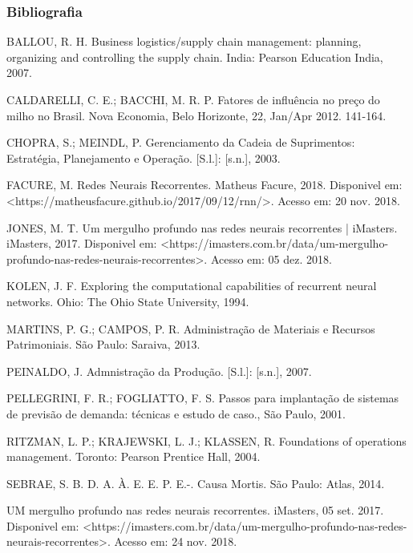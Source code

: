 \documentclass[9pt]{beamer}
\begin{document}
	\begin{frame}[allowframebreaks]
		\frametitle{Bibliografia}
	
		BALLOU, R. H. Business logistics/supply chain management: planning, organizing and controlling the supply chain. India: Pearson Education India, 2007.
		
		CALDARELLI, C. E.; BACCHI, M. R. P. Fatores de influência no preço do milho no Brasil. Nova Economia, Belo Horizonte, 22, Jan/Apr 2012. 141-164.
		
		CHOPRA, S.; MEINDL, P. Gerenciamento da Cadeia de Suprimentos: Estratégia, Planejamento e Operação. [S.l.]: [s.n.], 2003.
		
		FACURE, M. Redes Neurais Recorrentes. Matheus Facure, 2018. Disponivel em: <https://matheusfacure.github.io/2017/09/12/rnn/>. Acesso em: 20 nov. 2018.
		
		JONES, M. T. Um mergulho profundo nas redes neurais recorrentes | iMasters. iMasters, 2017. Disponivel em: <https://imasters.com.br/data/um-mergulho-profundo-nas-redes-neurais-recorrentes>. Acesso em: 05 dez. 2018.
		
		KOLEN, J. F. Exploring the computational capabilities of recurrent neural networks. Ohio: The Ohio State University, 1994.
		
		MARTINS, P. G.; CAMPOS, P. R. Administração de Materiais e Recursos Patrimoniais. São Paulo: Saraiva, 2013.
		
		PEINALDO, J. Admnistração da Produção. [S.l.]: [s.n.], 2007.
		
		PELLEGRINI, F. R.; FOGLIATTO, F. S. Passos para implantação de sistemas de previsão de demanda: técnicas e estudo de caso., São Paulo, 2001.
		
		RITZMAN, L. P.; KRAJEWSKI, L. J.; KLASSEN, R. Foundations of operations management. Toronto: Pearson Prentice Hall, 2004.
		
		SEBRAE, S. B. D. A. À. E. E. P. E.-. Causa Mortis. São Paulo: Atlas, 2014.
		
		UM mergulho profundo nas redes neurais recorrentes. iMasters, 05 set. 2017. Disponivel em: <https://imasters.com.br/data/um-mergulho-profundo-nas-redes-neurais-recorrentes>. Acesso em: 24 nov. 2018.
		
	\end{frame}
		
\end{document}
